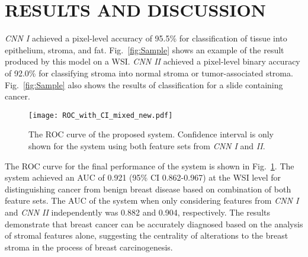 \documentclass{article}
\begin{document}
\section{RESULTS AND DISCUSSION}
\vspace*{-6 pt}
\textit{CNN I} achieved a pixel-level accuracy of 95.5\% for classification of tissue into epithelium, stroma, and fat. Fig.~\ref{fig:Sample} shows an example of the result produced by this model on a WSI. \textit{CNN II} achieved a pixel-level binary accuracy of 92.0\% for classifying stroma into normal stroma or tumor-associated stroma. Fig.~\ref{fig:Sample} also shows the results of classification for a slide containing cancer. \iffalse The performance of the two networks significantly improved after each round of hard-negative mining. Our data augmentation strategy played a crucial role in achieving high generalization on the validation set. Jittering the color information makes the network robust to staining variations in pathology images. Moreover, our random real-time patch sampling strategy acts as a strong regularizer as well. This is because unlike the approaches that use offline extracted data to train their network, our network rarely sees the exact same patch again during the entire training process.\fi

\begin{figure}
	\centering
		\texttt{[image: ROC\_with\_CI\_mixed\_new.pdf]}
	\vspace{-1.0em}
	\caption{\footnotesize{The ROC curve of the proposed system. Confidence interval is only shown for the system using both feature sets from \textit{CNN I} and \textit{II}.}}
	\label{fig:ROC_curve}
	\vspace{-1.0em}
\end{figure}

The ROC curve for the final performance of the system is shown in Fig.~\ref{fig:ROC_curve}. The system achieved an AUC of 0.921 (95\% CI 0.862-0.967) at the WSI level for distinguishing cancer from benign breast disease based on combination of both feature sets. The AUC of the system when only considering features from \textit{CNN I} and \textit{CNN II }independently was 0.882 and 0.904, respectively. The results demonstrate that breast cancer can be accurately diagnosed based on the analysis of stromal features alone, suggesting the centrality of alterations to the breast stroma in the process of breast carcinogenesis.

\end{document}
